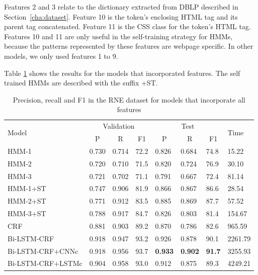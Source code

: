 \documentclass{nle}
\begin{document}
Features 2 and 3 relate to the dictionary extracted from DBLP described in Section~\ref{cha:dataset}.
Feature 10 is the token's enclosing HTML tag and its parent tag concatenated.
Feature 11 is the CSS class for the token's HTML tag.
Features 10 and 11 are only useful in the self-training strategy for HMMs, because
the patterns represented by these features are webpage specific. In other models, we only used
features 1 to 9.

Table \ref{tab:experiment2} shows the results for the models that incorporated features. 
The self trained HMMs are described with the suffix +ST.

\begin{table}[h]
  \small
  \begin{center}
    \begin{tabular}{ llllllll }
      \toprule
      \multirow{2}{*}{Model} & \multicolumn{3}{c}{Validation} & \multicolumn{3}{c}{Test}                       & \multirow{2}{*}{Time} \\
                             & \multicolumn{1}{c}{P}          & \multicolumn{1}{c}{R} & \multicolumn{1}{c}{F1}
                             & \multicolumn{1}{c}{P}          & \multicolumn{1}{c}{R} & \multicolumn{1}{c}{F1} & \\
      \midrule
      HMM-1                & 0.730 & 0.714 & 72.2 & 0.826 & 0.684 & 74.8 & 15.22 \\
      HMM-2                & 0.720 & 0.710 & 71.5 & 0.820 & 0.724 & 76.9 & 30.10 \\
      HMM-3                & 0.721 & 0.702 & 71.1 & 0.791 & 0.667 & 72.4 & 81.14 \\
      HMM-1+ST             & 0.747 & 0.906 & 81.9 & 0.866 & 0.867 & 86.6 & 28.54 \\
      HMM-2+ST             & 0.771 & 0.912 & 83.5 & 0.885 & 0.869 & 87.7 & 57.52 \\
      HMM-3+ST             & 0.788 & 0.917 & 84.7 & 0.826 & 0.803 & 81.4 & 154.67 \\
      CRF                  & 0.881 & 0.903 & 89.2 & 0.870 & 0.786 & 82.6 & 965.59 \\
      Bi-LSTM-CRF          & 0.918 & 0.947 & 93.2 & 0.926 & 0.878 & 90.1 & 2261.79 \\
      Bi-LSTM-CRF+CNNc     & 0.918 & 0.956 & 93.7 & \textbf{0.933} & \textbf{0.902} & \textbf{91.7} & 3255.93 \\
      Bi-LSTM-CRF+LSTMc    & 0.904 & 0.958 & 93.0 & 0.912 & 0.875 & 89.3 & 4249.21 \\
      \bottomrule
    \end{tabular}
  \end{center}
  \caption{Precision, recall and F1 in the RNE dataset for models that incorporate all features}
  \label{tab:experiment2}
\end{table}
\end{document}
